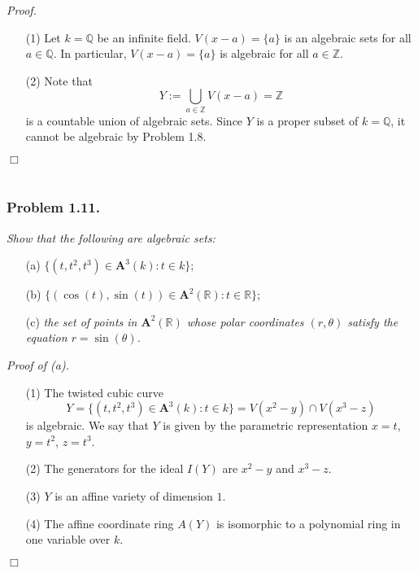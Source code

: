 \documentclass{article}
\begin{document}
\emph{Proof.}
\begin{enumerate}
\item[(1)]
  Let $k = \mathbb{Q}$ be an infinite field.
  $V(x-a) = \{ a \}$ is an algebraic sets for all $a \in \mathbb{Q}$.
  In particular, $V(x-a) = \{ a \}$ is algebraic for all $a \in \mathbb{Z}$.

\item[(2)]
  Note that
  \[
    Y := \bigcup_{a \in \mathbb{Z}} V(x-a) = \mathbb{Z}
  \]
  is a countable union of algebraic sets.
  Since $Y$ is a proper subset of $k = \mathbb{Q}$,
  it cannot be algebraic by Problem 1.8.
\end{enumerate}
$\Box$ \\\\






\subsubsection*{Problem 1.11.}
\emph{Show that the following are algebraic sets:}
\begin{enumerate}
\item[(a)]
  $\{ (t,t^2,t^3) \in \mathbf{A}^{3}(k) : t \in k \}$;

\item[(b)]
  $\{ (\cos(t),\sin(t)) \in \mathbf{A}^{2}(\mathbb{R}) : t \in \mathbb{R} \}$;

\item[(c)]
  \emph{the set of points in $\mathbf{A}^{2}(\mathbb{R})$
  whose polar coordinates $(r,\theta)$ satisfy the equation $r = \sin(\theta)$.} \\
\end{enumerate}



\emph{Proof of (a).}
\begin{enumerate}
\item[(1)]
  The twisted cubic curve
  \[
    Y = \{ (t,t^2,t^3) \in \mathbf{A}^3(k) : t \in k \}
    =
    V(x^2-y) \cap V(x^3-z)
  \]
  is algebraic.
  We say that $Y$ is given by the parametric representation $x=t$, $y=t^2$, $z=t^3$.

\item[(2)]
  The generators for the ideal $I(Y)$ are $x^2-y$ and $x^3-z$.

\item[(3)]
  $Y$ is an affine variety of dimension $1$.

\item[(4)]
  The affine coordinate ring $A(Y)$ is isomorphic to a polynomial ring in one variable over $k$.
\end{enumerate}
$\Box$ \\
\end{document}
